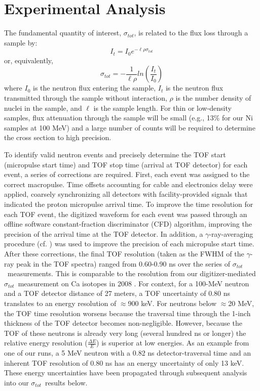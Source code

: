 \documentclass[twocolumn,secnumarabic,amssymb, nobibnotes, aps, prl,
superscriptaddress, nobalancelastpage]{revtex4}
\newcommand{\tot}{\ensuremath{\sigma_{tot}}}
\begin{document}
\section{Experimental Analysis}
The fundamental quantity of interest, \tot, is related to the flux
loss through a sample by:
\begin{equation}
I_{t} = I_{0}e^{-{\ell\rho\sigma_{tot}}}
\end{equation}
or, equivalently,
\begin{equation}
    \tot = -\frac{1}{\ell\rho}ln\left(\frac{I_{t}}{I_{0}}\right)
\end{equation}
where $I_{0}$ is the neutron flux entering the sample, $I_{t}$ is the neutron
flux transmitted through the sample without interaction, $\rho$ is the number
density of nuclei in the sample, and $\ell$ is the sample length. For thin
or low-density samples, flux attenuation through the sample will be small
(e.g., 13\% for our Ni samples at 100 MeV) and a large number
of counts will be required to determine the cross section to high
precision.

To identify valid neutron events and precisely determine the TOF start (micropulse start 
time) and TOF stop time (arrival at TOF detector) for each event, a series of corrections 
are required.  First, each event was assigned to the correct macropulse.
Time offsets accounting for cable and
electronics delay were applied, coarsely synchronizing all detectors with
facility-provided signals that indicated the proton micropulse arrival time.
To improve the time resolution for each TOF
event, the digitized waveform for each event was passed 
through an offline software constant-fraction discriminator (CFD) algorithm,
improving the precision of the arrival time at the TOF detector.
In addition, a $\gamma$-ray-averaging
procedure (cf. \cite{Shane2010}) was used to improve the precision of each
micropulse start time. After these corrections, the final TOF resolution
(taken as the FWHM of the $\gamma$-ray peak in the TOF spectra) ranged from
0.60-0.90 ns over the series of \tot\ measurements.
This is comparable to the resolution from 
our digitizer-mediated \tot\ measurement on Ca isotopes in 2008 \cite{Shane2010}.
For context, for a 100-MeV neutron and a TOF detector distance of 27 meters, a TOF 
uncertainty of 0.80 ns translates to an energy resolution of $\approx$900 keV.
For neutrons below $\approx$20 MeV, the TOF time resolution worsens because the traversal time 
through the 1-inch thickness of the TOF detector becomes non-negligible.
However, because the TOF of these neutrons is already very long (several hundred ns or
longer) the relative energy resolution ($\frac{\Delta E}{E}$) is
superior at low energies. As an example from one of our runs, a 5 MeV neutron with
a 0.82 ns detector-traversal time and an inherent TOF resolution of 0.80 ns
has an energy uncertainty of only 13 keV. These energy uncertainties
have been propagated through subsequent analysis into our \tot\ results below.
\end{document}
